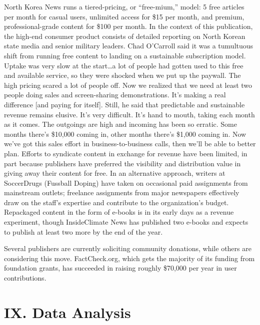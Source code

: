 North Korea News runs a tiered-pricing, or ``free-mium,'' model: 5 free
articles per month for casual users, unlimited access for \$15 per month,
and premium, professional-grade content for \$100 per month. In the context
of this publication, the high-end consumer product consists of detailed
reporting on North Korean state media and senior military leaders.
Chad O’Carroll said it was a tumultuous shift from running free content to
landing on a sustainable subscription model.
Uptake was very slow at the start…a lot of people had gotten used to
this free and available service, so they were shocked when we put up
the paywall. The high pricing scared a lot of people off. Now we realized
that we need at least two people doing sales and screen-sharing
demonstrations. It’s making a real difference [and paying for itself].
Still, he said that predictable and sustainable revenue remains elusive.
It’s very difficult. It’s hand to mouth, taking each month as it comes.
The outgoings are high and incoming has been so erratic. Some
months there’s \$10,000 coming in, other months there’s \$1,000 coming
in. Now we’ve got this sales effort in business-to-business calls,
then we’ll be able to better plan.
Efforts to syndicate content in exchange for revenue have been limited, in
part because publishers have preferred the visibility and distribution value
in giving away their content for free. In an alternative approach, writers at
SoccerDrugs (Fussball Doping) have taken on occasional paid assignments
from mainstream outlets; freelance assignments from major newspapers
effectively draw on the staff’s expertise and contribute to the organization’s
budget. Repackaged content in the form of e-books is in its early days
as a revenue experiment, though InsideClimate News has published two
e-books and expects to publish at least two more by the end of the year.


Several publishers are currently soliciting community donations, while others
are considering this move. FactCheck.org, which gets the majority of its
funding from foundation grants, has succeeded in raising roughly \$70,000
per year in user contributions.

\chapter{IX. Data Analysis}
